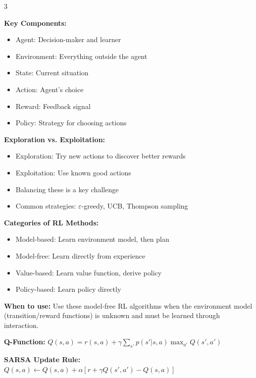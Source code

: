 \documentclass[10pt,landscape]{article}
\begin{document}
\begin{multicols}{3}
\begin{tcolorbox}[breakable, title=11. Reinforcement Learning Concepts, colback=rl]
\textbf{Key Components:}
\begin{itemize}[leftmargin=*,noitemsep,topsep=0pt]
    \item Agent: Decision-maker and learner
    \item Environment: Everything outside the agent
    \item State: Current situation
    \item Action: Agent's choice
    \item Reward: Feedback signal
    \item Policy: Strategy for choosing actions
\end{itemize}

\textbf{Exploration vs. Exploitation:}
\begin{itemize}[leftmargin=*,noitemsep,topsep=0pt]
    \item Exploration: Try new actions to discover better rewards
    \item Exploitation: Use known good actions
    \item Balancing these is a key challenge
    \item Common strategies: $\varepsilon$-greedy, UCB, Thompson sampling
\end{itemize}

\textbf{Categories of RL Methods:}
\begin{itemize}[leftmargin=*,noitemsep,topsep=0pt]
    \item Model-based: Learn environment model, then plan
    \item Model-free: Learn directly from experience
    \item Value-based: Learn value function, derive policy
    \item Policy-based: Learn policy directly
\end{itemize}
\end{tcolorbox}

\begin{tcolorbox}[breakable, title=11.1 Q-Learning and SARSA, colback=rl]
\textbf{When to use:} Use these model-free RL algorithms when the environment model (transition/reward functions) is unknown and must be learned through interaction.

\textbf{Q-Function:} $Q(s,a) = r(s,a) + \gamma \sum_{s'} p(s'|s,a) \max_{a'} Q(s',a')$

\textbf{SARSA Update Rule:}
$Q(s, a) \leftarrow Q(s, a) + \alpha[r + \gamma Q(s', a') - Q(s, a)]$


\end{tcolorbox}
\end{multicols}
\end{document}
